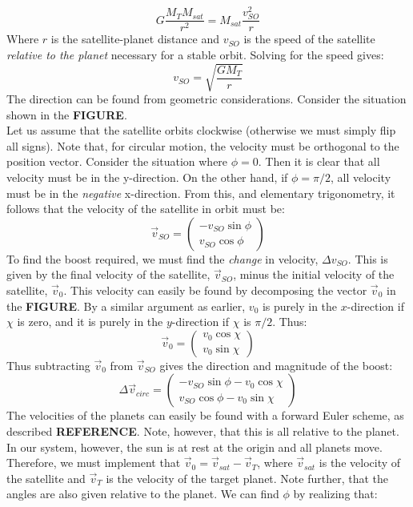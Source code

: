 \documentclass[a4paper,10pt,english]{article}
\begin{document}
$$G\frac{M_TM_{sat}}{r^2}=M_{sat}\frac{v_{SO}^2}{r}$$
Where $r$ is the satellite-planet distance and $v_{SO}$ is the speed of the satellite \textit{relative to the planet} necessary for a stable orbit. Solving for the speed gives:
\begin{equation}\label{eq:circular_motion_velocity}
v_{SO}=\sqrt{\frac{GM_T}{r}}
\end{equation}
The direction can be found from geometric considerations. Consider the situation shown in the \textbf{FIGURE}.\\
\linebreak
Let us assume that the satellite orbits clockwise (otherwise we must simply flip all signs). Note that, for circular motion, the velocity must be orthogonal to the position vector. Consider the situation where $\phi=0$. Then it is clear that all velocity must be in the y-direction. On the other hand, if $\phi=\pi/2$, all velocity must be in the \textit{negative} x-direction. From this, and elementary trigonometry, it follows that the velocity of the satellite in orbit must be:
$$\vec{v}_{SO}=\begin{pmatrix}
-v_{SO}\sin \phi\\
v_{SO}\cos \phi
\end{pmatrix}$$
To find the boost required, we must find the \textit{change} in velocity, $\Delta v_{SO}$. This is given by the final velocity of the satellite, $\vec{v}_{SO}$, minus the initial velocity of the satellite, $\vec{v}_0$. This velocity can easily be found by decomposing the vector $\vec{v}_0$ in the \textbf{FIGURE}. By a similar argument as earlier, $v_0$ is purely in the $x$-direction if $\chi$ is zero, and it is purely in the $y$-direction if $\chi$ is $\pi/2$. Thus:
$$\vec{v}_0=\begin{pmatrix}
v_0\cos \chi\\
v_0\sin \chi
\end{pmatrix}$$
Thus subtracting $\vec{v}_0$ from $\vec{v}_{SO}$ gives the direction and magnitude of the boost:
\begin{equation}
\Delta \vec{v}_{circ}=\begin{pmatrix}
-v_{SO}\sin \phi - v_0\cos \chi\\
v_{SO}\cos \phi - v_0\sin \chi
\end{pmatrix}
\end{equation}
The velocities of the planets can easily be found with a forward Euler scheme, as described \textbf{REFERENCE}. Note, however, that this is all relative to the planet. In our system, however, the sun is at rest at the origin and all planets move. Therefore, we must implement that $\vec{v}_0=\vec{v}_{sat}-\vec{v}_T$, where $\vec{v}_{sat}$ is the velocity of the satellite and $\vec{v}_T$ is the velocity of the target planet. Note further, that the angles are also given relative to the planet. We can find $\phi$ by realizing that:
\end{document}
